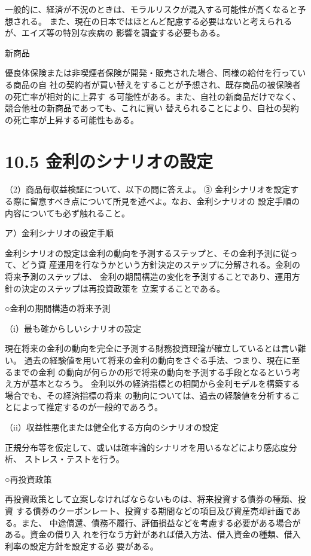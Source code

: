 \documentclass[report,gutter=10mm,fore-edge=10mm,uplatex,dvipdfmx]{jlreq}
\begin{document}
一般的に、経済が不況のときは、モラルリスクが混入する可能性が高くなると予想される。
また、現在の日本ではほとんど配慮する必要はないと考えられるが、エイズ等の特別な疾病の
影響を調査する必要もある。

新商品

優良体保険または非喫煙者保険が開発・販売された場合、同様の給付を行っている商品の自
社の契約者が買い替えをすることが予想され、既存商品の被保険者の死亡率が相対的に上昇す
る可能性がある。また、自社の新商品だけでなく、競合他社の新商品であっても、これに買い
替えられることにより、自社の契約の死亡率が上昇する可能性もある。

\section{10.5 金利のシナリオの設定}
（2）商品毎収益検証について、以下の問に答えよ。
③ 金利シナリオを設定する際に留意すべき点について所見を述べよ。なお、金利シナリオの
設定手順の内容についても必ず触れること。

\answer{}
ア）金利シナリオの設定手順

金利シナリオの設定は金利の動向を予測するステップと、その金利予測に従って、どう資
産運用を行なうかという方針決定のステップに分解される。金利の将来予測のステップは、
金利の期間構造の変化を予測することであり、運用方針の決定のステップは再投資政策を
立案することである。

○金利の期間構造の将来予測

（i）最も確からしいシナリオの設定

現在将来の金利の動向を完全に予測する財務投資理論が確立しているとは言い難い。
過去の経験値を用いて将来の金利の動向をさぐる手法、つまり、現在に至るまでの金利
の動向が何らかの形で将来の動向を予測する手段となるという考え方が基本となろう。
金利以外の経済指標との相関から金利モデルを構築する場合でも、その経済指標の将来
の動向については、過去の経験値を分析することによって推定するのが一般的であろう。

（ii）収益性悪化または健全化する方向のシナリオの設定

正規分布等を仮定して、或いは確率論的シナリオを用いるなどにより感応度分析、
ストレス・テストを行う。

○再投資政策

再投資政策として立案しなければならないものは、将来投資する債券の種類、投資
する債券のクーポンレート、投資する期間などの項目及び資産売却計画である。また、
中途償還、債務不履行、評価損益などを考慮する必要がある場合がある。資金の借り入
れを行なう方針があれば借入方法、借入資金の種類、借入利率の設定方針を設定する必
要がある。
\end{document}
